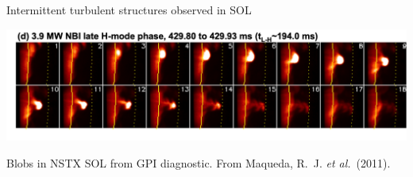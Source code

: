 \documentclass[12pt,table]{beamer}
\newcommand{\etal}{\emph{et al.}}
\begin{document}
\begin{frame}{Intermittent turbulent structures observed in SOL}
    \vfill
    \begin{minipage}{0.63\linewidth}
        \centering
        \includegraphics[clip, trim=.25cm .2cm 0cm .6cm, width=\linewidth]{figs/nstx-blob.png}
    \end{minipage} \hfill
    \begin{minipage}{0.35\linewidth}
        \scriptsize Blobs in NSTX SOL from GPI diagnostic. From Maqueda, R.~J. \etal\ (2011).
        \label{fig:nstx-blob}
        \end{minipage}%
\end{frame}
\end{document}
